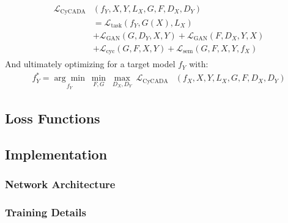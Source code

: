 \begin{align}
	\begin{split}
		\mathcal{L}_{\text{CyCADA}}&(f_Y, X, Y, L_X, G, F, D_X, D_Y)\\
		&= \mathcal{L}_{\text{task}}(f_Y, G(X), L_X)\\
		&+ \mathcal{L}_{\text{GAN}}(G, D_Y, X, Y) + \mathcal{L}_{\text{GAN}}(F, D_X, Y, X)\\
		&+ \mathcal{L}_{\text{cyc}}(G, F, X, Y) + \mathcal{L}_{\text{sem}}(G, F, X, Y, f_X)
	\end{split}
\end{align}
And ultimately optimizing for a target model $f_Y$ with:
\begin{align}
	f^*_Y = \underset{f_Y}{\arg\min} ~ \underset{F,G}{\min} ~ \underset{D_X, D_Y}{\max} ~ \mathcal{L}_{\text{CyCADA}}&(f_X, X, Y, L_X, G, F, D_X, D_Y)
\end{align}

\subsection{Loss Functions}
\subsection{Implementation}
\subsubsection{Network Architecture}
\subsubsection{Training Details}

